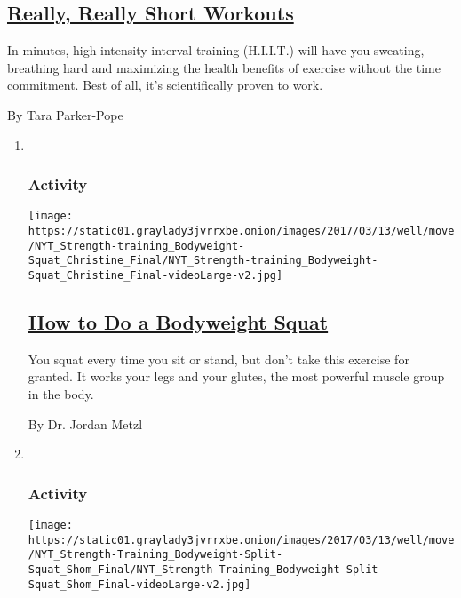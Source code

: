 \begin{enumerate}
  \hypertarget{really-really-short-workouts}{%
  \subsection{\texorpdfstring{\href{/interactive/2016/well/move/well-shortworkouts-guide-interactive.html}{Really,
  Really Short
  Workouts}}{Really, Really Short Workouts}}\label{really-really-short-workouts}}

  In minutes, high-intensity interval training (H.I.I.T.) will have you
  sweating, breathing hard and maximizing the health benefits of
  exercise without the time commitment. Best of all, it's scientifically
  proven to work.

  By Tara Parker-Pope
\end{enumerate}

\begin{enumerate}
\def\labelenumi{\arabic{enumi}.}
\item ~
  \hypertarget{activity}{%
  \subsubsection{Activity}\label{activity}}

  \texttt{[image: https://static01.graylady3jvrrxbe.onion/images/2017/03/13/well/move/NYT\_Strength-training\_Bodyweight-Squat\_Christine\_Final/NYT\_Strength-training\_Bodyweight-Squat\_Christine\_Final-videoLarge-v2.jpg]}

  \hypertarget{how-to-do-a-bodyweight-squat}{%
  \subsection{\texorpdfstring{\href{/interactive/2017/well/move/how-to-do-a-bodyweight-squat.html}{How
  to Do a Bodyweight
  Squat}}{How to Do a Bodyweight Squat}}\label{how-to-do-a-bodyweight-squat}}

  You squat every time you sit or stand, but don't take this exercise
  for granted. It works your legs and your glutes, the most powerful
  muscle group in the body.

  By Dr. Jordan Metzl
\item ~
  \hypertarget{activity-1}{%
  \subsubsection{Activity}\label{activity-1}}

  \texttt{[image: https://static01.graylady3jvrrxbe.onion/images/2017/03/13/well/move/NYT\_Strength-Training\_Bodyweight-Split-Squat\_Shom\_Final/NYT\_Strength-Training\_Bodyweight-Split-Squat\_Shom\_Final-videoLarge-v2.jpg]}


\end{enumerate}
